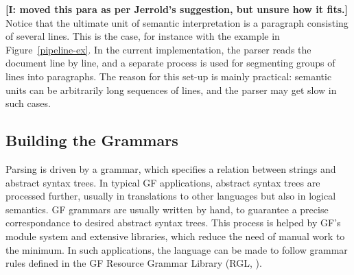 \documentclass{IOS-Book-Article}
\newcommand{\todoj}[1]{{\color{red}\textbf{[J: #1]}}}
\newcommand{\todoi}[1]{{\color{magenta}\textbf{[I: #1]}}}
\begin{document}



\todoi{moved this para as per Jerrold's suggestion, but unsure how it fits.}
Notice that the ultimate unit of semantic interpretation is a paragraph consisting of several lines.
This is the case, for instance with the example in Figure~\ref{pipeline-ex}.
In the current implementation, the parser reads the document line by line, and a separate process is used for segmenting groups of lines into paragraphs.
The reason for this set-up is mainly practical: semantic units can be arbitrarily long sequences of lines, and the parser may get slow in such cases.


\subsection{Building the Grammars}

Parsing is driven by a grammar, which specifies a relation between strings and abstract syntax trees.
In typical GF applications, abstract syntax trees are processed further, usually in translations to other languages but also in logical semantics.
GF grammars are usually written by hand, to guarantee a precise correspondance to desired abstract syntax trees.
This process is helped by GF's module system and extensive libraries, which reduce the need of manual work to the minimum.
In such applications, the language can be made to follow grammar rules defined in the GF Resource Grammar Library (RGL, \cite{ranta-2009}).
\end{document}
